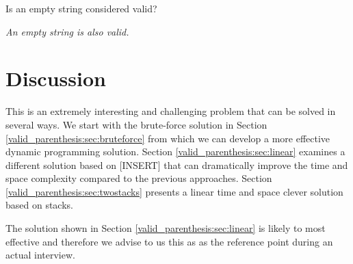 \begin{QandA}
	\item \begin{questionitem} \begin{question} Is an empty string considered valid?  \end{question} 	 
    \begin{answered}
		\textit{An empty string is also valid.}
	\end{answered} \end{questionitem}
	
\end{QandA}

\section{Discussion}
\label{valid_parenthesis:sec:discussion}
This is an extremely interesting and challenging problem that can be solved in several ways. We start with the brute-force solution in Section \ref{valid_parenthesis:sec:bruteforce} from which we can develop a more effective dynamic programming solution.  Section \ref{valid_parenthesis:sec:linear} examines a different solution based on [INSERT]  that can dramatically improve the time and space complexity compared to the previous approaches. Section \ref{valid_parenthesis:sec:twostacks} presents a linear time and space clever solution based on stacks.

The solution shown in Section \ref{valid_parenthesis:sec:linear} is likely to most effective and therefore we advise to us this as as the reference point during an actual interview.

